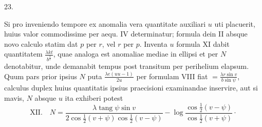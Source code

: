 \begin{center}
23.
\end{center}
Si pro inveniendo tempore ex anomalia vera quantitate auxiliari $u$ uti placuerit, huius valor commodissime per aequ. IV determinatur; formula dein II absque novo calculo statim dat $p$ per $r$, vel $r$ per $p$. Inventa $u$ formula XI dabit quantitatem $\frac{\lambda k t}{b^{\frac{3}{2}}}$, quae analoga est anomaliae mediae in ellipsi et per $N$ denotabitur, unde demanabit tempus post transitum per perihelium elapsum. Quum pars prior ipsius $N$ puta $\frac{\lambda e(u u-1)}{2u}$ per formulam VIII fiat $=\frac{\lambda r\sin v}{b\sin\psi}$, calculus duplex huius quantitatis ipsius praecisioni examinandae inservire, aut si mavis, $N$ absque $u$ ita exhiberi potest
\[
\mathrm{XII.}\quad N=\frac{\lambda\operatorname{tang}\psi\sin v}{2\cos\frac{1}{2}(v+\psi)\cos\frac{1}{2}(v-\psi)}-\log\frac{\cos\frac{1}{2}(v-\psi)}{\cos\frac{1}{2}(v+\psi)}\cdot
\]

